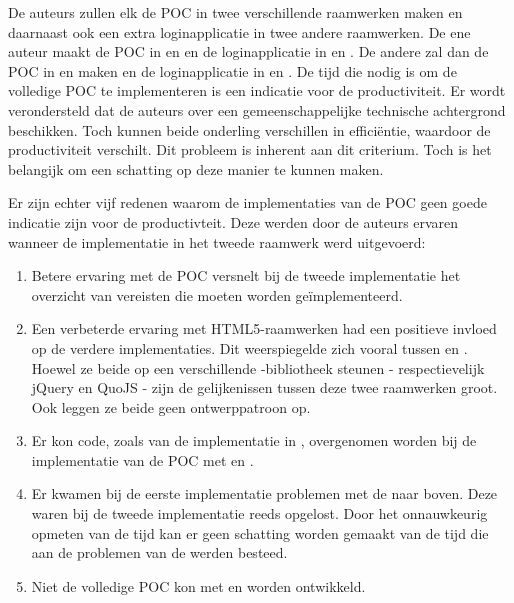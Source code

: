 De auteurs zullen elk de POC in twee verschillende raamwerken maken en daarnaast ook een extra loginapplicatie in twee andere raamwerken.
De ene auteur maakt de POC in \jqm{} en \lungo{} en de loginapplicatie in \st{} en \kendo{}.
De andere zal dan de POC in \st{} en \kendo{} maken en de loginapplicatie in \jqm{} en \lungo{}.
De tijd die nodig is om de volledige POC te implementeren is een indicatie voor de productiviteit. 
Er wordt verondersteld dat de auteurs over een gemeenschappelijke technische achtergrond beschikken.
Toch kunnen beide onderling verschillen in efficiëntie,  waardoor de productiviteit verschilt.
Dit probleem is inherent aan dit criterium.
Toch is het belangijk om een schatting op deze manier te kunnen maken.

% 

Er zijn echter vijf redenen waarom de implementaties van de POC geen goede indicatie zijn voor de productivteit.
Deze werden door de auteurs ervaren wanneer de implementatie in het tweede raamwerk werd uitgevoerd:
\begin{enumerate}
\item Betere ervaring met de POC versnelt bij de tweede implementatie het overzicht van vereisten die moeten worden geïmplementeerd. 
\item Een verbeterde ervaring met HTML5-raamwerken had een positieve invloed op de verdere implementaties.
Dit weerspiegelde zich vooral tussen \jqm{} en \lungo{}.
Hoewel ze beide op een verschillende \js{}-bibliotheek steunen - respectievelijk jQuery en QuoJS - zijn de gelijkenissen tussen deze twee raamwerken groot.
Ook leggen ze beide geen ontwerppatroon op.
\item Er kon code,  zoals van de implementatie in \jqm{},  overgenomen worden bij de implementatie van de POC met \lungo{} en \kendo{}.
\item Er kwamen bij de eerste implementatie problemen met de  naar boven.
Deze waren bij de tweede implementatie reeds opgelost.
Door het onnauwkeurig opmeten van de tijd kan er geen schatting worden gemaakt van de tijd die aan de problemen van de  werden besteed.
\item Niet de volledige POC kon met \lungo{} en \st{} worden ontwikkeld.
\end{enumerate}

